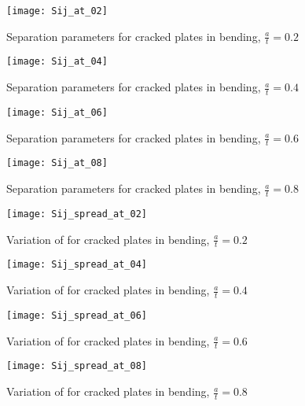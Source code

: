 \begin{figure}[tbp]
\centering
\texttt{[image: Sij\_at\_02]}
\caption{Separation parameters for cracked plates in bending, \(\frac{a}{t}=0.2\) \label{fig:Sij_at_02}}
\end{figure}
\begin{figure}[tbp]
\centering
\texttt{[image: Sij\_at\_04]}
\caption{Separation parameters for cracked plates in bending, \(\frac{a}{t}=0.4\) \label{fig:Sij_at_04}}
\end{figure}
\begin{figure}[tbp]
\centering
\texttt{[image: Sij\_at\_06]}
\caption{Separation parameters for cracked plates in bending, \(\frac{a}{t}=0.6\) \label{fig:Sij_at_06}}
\end{figure}
\begin{figure}[tbp]
\centering
\texttt{[image: Sij\_at\_08]}
\caption{Separation parameters for cracked plates in bending, \(\frac{a}{t}=0.8\) \label{fig:Sij_at_08}}
\end{figure}

\begin{figure}[tbp]
\centering
\texttt{[image: Sij\_spread\_at\_02]}
\caption{Variation of \Sij for cracked plates in bending, \(\frac{a}{t}=0.2\) \label{fig:Sij_spread_at_02}}
\end{figure}
\begin{figure}[tbp]
\centering
\texttt{[image: Sij\_spread\_at\_04]}
\caption{Variation of \Sij for cracked plates in bending, \(\frac{a}{t}=0.4\) \label{fig:Sij_spread_at_04}}
\end{figure}
\begin{figure}[tbp]
\centering
\texttt{[image: Sij\_spread\_at\_06]}
\caption{Variation of \Sij for cracked plates in bending, \(\frac{a}{t}=0.6\) \label{fig:Sij_spread_at_06}}
\end{figure}
\begin{figure}[tbp]
\centering
\texttt{[image: Sij\_spread\_at\_08]}
\caption{Variation of \Sij for cracked plates in bending, \(\frac{a}{t}=0.8\) \label{fig:Sij_spread_at_08}}
\end{figure}

